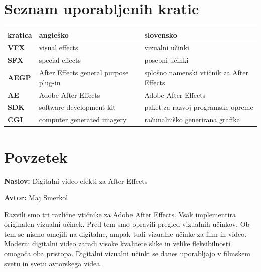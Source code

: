 \documentclass[a4paper, 12pt]{book}
\newcommand{\ttitle}{Digitalni video efekti za After Effects}
\newcommand{\tauthor}{Maj Smerkol}
\newcommand{\clearemptydoublepage}{\newpage{\pagestyle{empty}\cleardoublepage}}
\begin{document}
\pagestyle{empty}
\def\thepage{}%
\tableofcontents{}


\clearemptydoublepage


\chapter*{Seznam uporabljenih kratic}  %

\noindent\begin{tabular}{p{}|p{}|p{}}    %
  {\bf kratica} & {\bf angleško}              				& {\bf slovensko} \\ \hline
  {\bf VFX}      & visual effects               				& vizualni učinki \\
  {\bf SFX}      & special effects              				& posebni učinki \\
  {\bf AEGP}   & After Effects general purpose plug-in 	& splošno namenski vtičnik za After Effects \\
  {\bf AE}       & Adobe After Effects 				&  Adobe After Effects \\
  {\bf SDK}     & software development kit 			&  paket za razvoj programske opreme \\
  {\bf CGI}	& computer generated imagery			& računalniško generirana grafika \\

\end{tabular}


\clearemptydoublepage

\chapter*{Povzetek}

\noindent\textbf{Naslov:} \ttitle
\bigskip

\noindent\textbf{Avtor:} \tauthor
\bigskip

\noindent Razvili smo tri različne vtičnike za Adobe After Effects. 
Vsak implementira originalen vizualni učinek. 
Pred tem smo opravili pregled vizualnih učinkov.
Ob tem se nismo omejili na digitalne, ampak tudi vizualne učinke za film in video.
Moderni digitalni video zaradi visoke kvalitete slike in velike fleksibilnosti omogoča oba pristopa.
Digitalni vizualni učinki se danes uporabljajo v filmskem svetu in svetu avtorskega videa.
\end{document}
